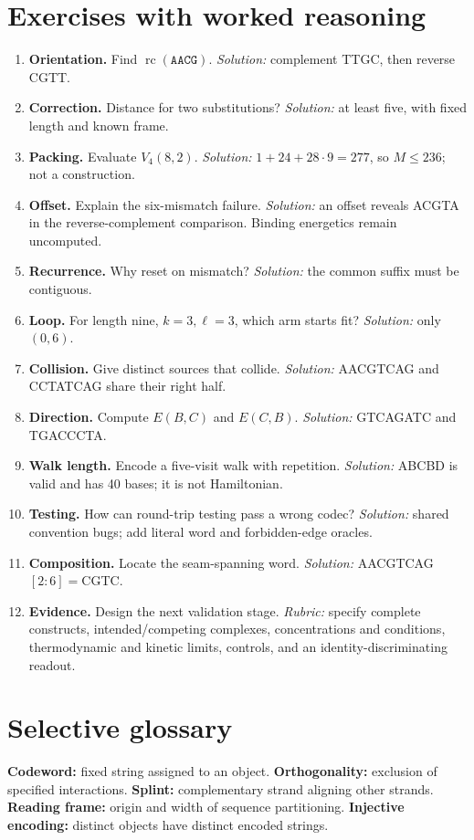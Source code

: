 \section{Exercises with worked reasoning}
\begin{enumerate}
\item \textbf{Orientation.} Find $\operatorname{rc}(\texttt{AACG})$.
 \emph{Solution:} complement TTGC, then reverse CGTT.
\item \textbf{Correction.} Distance for two substitutions?
 \emph{Solution:} at least five, with fixed length and known frame.
\item \textbf{Packing.} Evaluate $V_4(8,2)$.
 \emph{Solution:} $1+24+28\cdot9=277$, so $M\le236$; not a construction.
\item \textbf{Offset.} Explain the six-mismatch failure.
 \emph{Solution:} an offset reveals ACGTA in the reverse-complement comparison.
 Binding energetics remain uncomputed.
\item \textbf{Recurrence.} Why reset on mismatch?
 \emph{Solution:} the common suffix must be contiguous.
\item \textbf{Loop.} For length nine, $k=3,\ell=3$, which arm starts fit?
 \emph{Solution:} only $(0,6)$.
\item \textbf{Collision.} Give distinct sources that collide.
 \emph{Solution:} AACGTCAG and CCTATCAG share their right half.
\item \textbf{Direction.} Compute $E(B,C)$ and $E(C,B)$.
 \emph{Solution:} GTCAGATC and TGACCCTA.
\item \textbf{Walk length.} Encode a five-visit walk with repetition.
 \emph{Solution:} ABCBD is valid and has 40 bases; it is not Hamiltonian.
\item \textbf{Testing.} How can round-trip testing pass a wrong codec?
 \emph{Solution:} shared convention bugs; add literal word and forbidden-edge oracles.
\item \textbf{Composition.} Locate the seam-spanning word.
 \emph{Solution:} AACGTCAG$[2{:}6]=$CGTC.
\item \textbf{Evidence.} Design the next validation stage.
 \emph{Rubric:} specify complete constructs, intended/competing complexes,
 concentrations and conditions, thermodynamic and kinetic limits, controls,
 and an identity-discriminating readout.
\end{enumerate}
\section*{Selective glossary}
\textbf{Codeword:} fixed string assigned to an object.
\textbf{Orthogonality:} exclusion of specified interactions.
\textbf{Splint:} complementary strand aligning other strands.
\textbf{Reading frame:} origin and width of sequence partitioning.
\textbf{Injective encoding:} distinct objects have distinct encoded strings.
